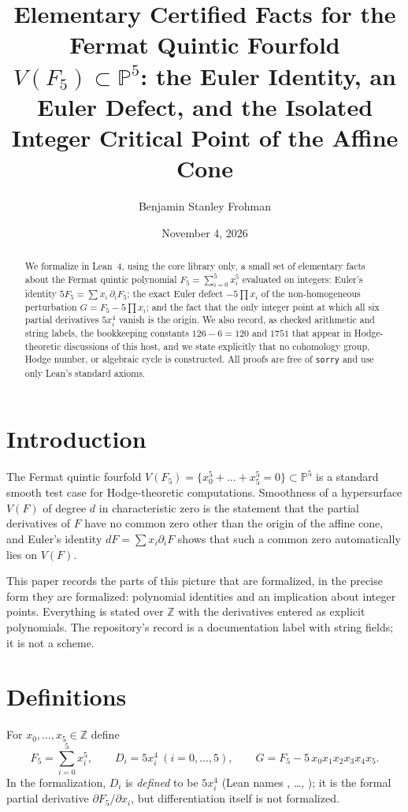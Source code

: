 \documentclass[11pt]{amsart}
\title[Elementary certified facts for the Fermat quintic fourfold]{Elementary Certified Facts for the Fermat Quintic Fourfold $V(F_5)\subset\mathbb{P}^5$: the Euler Identity, an Euler Defect, and the Isolated Integer Critical Point of the Affine Cone}
\author{Benjamin Stanley Frohman}
\date{November 4, 2026}
\theoremstyle{definition}
\theoremstyle{remark}
\newcommand{\lean}[1]{\path{#1}}
\begin{document}
\begin{abstract}
We formalize in Lean~4, using the core library only, a small set of elementary facts about the Fermat quintic polynomial $F_5=\sum_{i=0}^5 x_i^5$ evaluated on integers: Euler's identity $5F_5=\sum x_i\,\partial_iF_5$; the exact Euler defect $-5\prod x_i$ of the non-homogeneous perturbation $G=F_5-5\prod x_i$; and the fact that the only integer point at which all six partial derivatives $5x_i^4$ vanish is the origin. We also record, as checked arithmetic and string labels, the bookkeeping constants $126-6=120$ and $1751$ that appear in Hodge-theoretic discussions of this host, and we state explicitly that no cohomology group, Hodge number, or algebraic cycle is constructed. All proofs are free of \texttt{sorry} and use only Lean's standard axioms.
\end{abstract}
\maketitle
{}\par


\section{Introduction}
The Fermat quintic fourfold $V(F_5)=\{x_0^5+\dots+x_5^5=0\}\subset\mathbb{P}^5$ is a standard smooth test case for Hodge-theoretic computations. Smoothness of a hypersurface $V(F)$ of degree $d$ in characteristic zero is the statement that the partial derivatives of $F$ have no common zero other than the origin of the affine cone, and Euler's identity $dF=\sum x_i\partial_iF$ shows that such a common zero automatically lies on $V(F)$.

This paper records the parts of this picture that are formalized, in the precise form they are formalized: polynomial identities and an implication about integer points. Everything is stated over $\mathbb{Z}$ with the derivatives entered as explicit polynomials. The repository's \lean{HostLabel} record is a documentation label with string fields; it is not a scheme.

\section{Definitions}
For $x_0,\dots,x_5\in\mathbb{Z}$ define
\[
F_5=\sum_{i=0}^5 x_i^5,\qquad D_i=5x_i^4\ (i=0,\dots,5),\qquad G=F_5-5\,x_0x_1x_2x_3x_4x_5 .
\]
In the formalization, $D_i$ is \emph{defined} to be $5x_i^4$ (Lean names \lean{dF5_dx0}, \dots, \lean{dF5_dx5}); it is the formal partial derivative $\partial F_5/\partial x_i$, but differentiation itself is not formalized.
\end{document}

